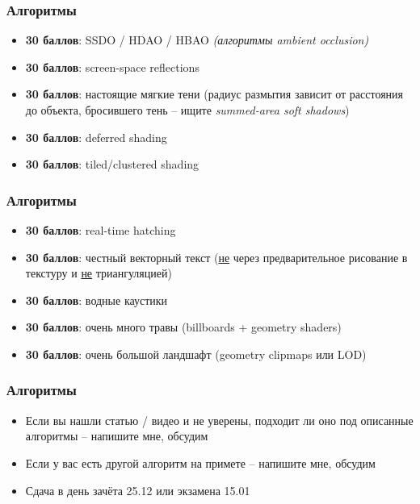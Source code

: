 \documentclass{beamer}
\begin{document}
\begin{frame}[fragile]
\frametitle{Алгоритмы}
\begin{itemize}
\item \textbf{30 баллов}: SSDO / HDAO / HBAO \textit{(алгоритмы ambient occlusion)}
\item \textbf{30 баллов}: screen-space reflections
\item \textbf{30 баллов}: настоящие мягкие тени (радиус размытия зависит от расстояния до объекта, бросившего тень -- ищите \textit{summed-area soft shadows})
\item \textbf{30 баллов}: deferred shading
\item \textbf{30 баллов}: tiled/clustered shading
\end{itemize}
\end{frame}

\begin{frame}[fragile]
\frametitle{Алгоритмы}
\begin{itemize}
\item \textbf{30 баллов}: real-time hatching
\item \textbf{30 баллов}: честный векторный текст (\underline{не} через предварительное рисование в текстуру и \underline{не} триангуляцией)
\item \textbf{30 баллов}: водные каустики
\item \textbf{30 баллов}: очень много травы (billboards + geometry shaders)
\item \textbf{30 баллов}: очень большой ландшафт (geometry clipmaps или LOD)
\end{itemize}
\end{frame}

\begin{frame}[fragile]
\frametitle{Алгоритмы}
\begin{itemize}
\item Если вы нашли статью / видео и не уверены, подходит ли оно под описанные алгоритмы -- напишите мне, обсудим
\pause
\item Если у вас есть другой алгоритм на примете -- напишите мне, обсудим
\pause
\item Сдача в день зачёта 25.12 или экзамена 15.01
\end{itemize}
\end{frame}
\end{document}
